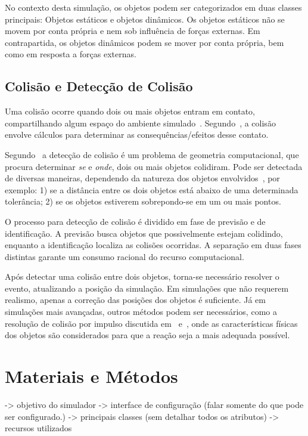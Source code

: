 \documentclass[12pt]{article}
\begin{document}
No contexto desta simulação, os objetos podem ser categorizados em duas classes principais: Objetos estáticos e objetos dinâmicos. Os objetos estáticos não se movem por conta própria e nem sob influência de forças externas. Em contrapartida, os objetos dinâmicos podem se mover por conta própria, bem como em resposta a forças externas.

\subsection{Colisão e Detecção de Colisão}

Uma colisão ocorre quando dois ou mais objetos entram em contato, compartilhando algum espaço do ambiente simulado~\cite{ericson2004real}. Segundo~\cite{bourg2013physics}, a colisão envolve cálculos para determinar as consequências/efeitos desse contato.

Segundo~\cite{bourg2013physics} a detecção de colisão é um problema de geometria computacional, que procura determinar \emph{se} e \emph{onde}, dois ou mais objetos colidiram. Pode ser detectada de diversas maneiras, dependendo da natureza dos objetos envolvidos~\cite{foley1996}, por exemplo: 1) se a distância entre os dois objetos está abaixo de uma determinada tolerância; 2) se os objetos estiverem sobrepondo-se em um ou mais pontos.

O processo para detecção de colisão é dividido em fase de previsão e de identificação. A previsão busca objetos que possivelmente estejam colidindo, enquanto a identificação localiza as colisões ocorridas. A separação em duas fases distintas garante um consumo racional do recurso computacional. 

Após detectar uma colisão entre dois objetos, torna-se necessário resolver o evento, atualizando a posição da simulação. Em simulações que não requerem realismo, apenas a correção das posições dos objetos é suficiente. Já em simulações mais avançadas, outros métodos podem ser necessários, como a resolução de colisão por impulso discutida em~\cite{bourg2013physics} e~\cite{baraff1992dynamic}, onde as características físicas dos objetos são considerados para que a reação seja a mais adequada possível.

\section{Materiais e Métodos}
-> objetivo do simulador
-> interface de configuração (falar somente do que pode ser configurado.)
-> principais classes (sem detalhar todos os atributos)
-> recursos utilizados
\end{document}
